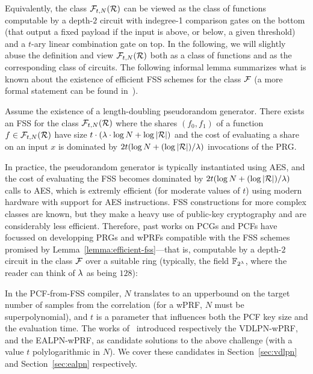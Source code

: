 Equivalently, the class $\mathcal{F}_{t,N}(\mathcal{R})$ can be viewed as the class of functions computable by a depth-$2$ circuit with indegree-1 comparison gates on the bottom (that output a fixed payload if the input is above, or below, a given threshold) and a $t$-ary linear combination gate on top. In the following, we will slightly abuse the definition and view $\mathcal{F}_{t,N}(\mathcal{R})$ both as a class of functions and as the corresponding class of circuits. The following informal lemma summarizes what is known about the existence of efficient FSS schemes for the class $\mathcal{F}$ (a more formal statement can be found in~\cite{CCS:BoyGilIsh16}).
\begin{lemma}[Informal]
\label{lemma:efficient-fss}
Assume the existence of a length-doubling pseudorandom generator. There exists an FSS for the class $\mathcal{F}_{t,N}(\mathcal{R})$ where the shares $(f_0,f_1)$ of a function $f\in\mathcal{F}_{t,N}(\mathcal{R})$ have size $t\cdot (\lambda\cdot \log N + \log|\mathcal{R}|)$ and the cost of evaluating a share on an input $x$ is dominated by $2t(\log N + (\log|\mathcal{R}|)/\lambda)$ invocations of the PRG.
\end{lemma}

In practice, the pseudorandom generator is typically instantiated using {\sf AES}, and the cost of evaluating the FSS becomes dominated by $2t(\log N + (\log|\mathcal{R}|)/\lambda)$ calls to {\sf AES}, which is extremly efficient (for moderate values of $t$) using modern hardware with support for {\sf AES} instructions. 
FSS constructions for more complex classes are known, but they make a heavy use of public-key cryptography and are considerably less efficient. Therefore, past works on PCGs and PCFs have focussed on developping PRGs and wPRFs compatible with the FSS schemes promised by Lemma~\ref{lemma:efficient-fss}---that is, computable by a depth-$2$ circuit in the class $\mathcal{F}$ over a suitable ring (typically, the field $\mathbb{F}_{2^\lambda}$, where the reader can think of $\lambda$ as being $128$):


In the PCF-from-FSS compiler, $N$ translates to an upperbound on the target number of samples from the correlation (for a wPRF, $N$ must be superpolynomial), and $t$ is a parameter that influences both the PCF key size and the evaluation time. The works of~\cite{FOCS:BCGIKS20,PKC:CouDuc23,C:BCGIKR22} introduced respectively the {\sf VDLPN-wPRF}, 
and the {\sf EALPN-wPRF}, as candidate solutions to the above challenge (with a value $t$ polylogarithmic in $N$). We cover these candidates in Section~\ref{sec:vdlpn} and Section~\ref{sec:ealpn} respectively.

